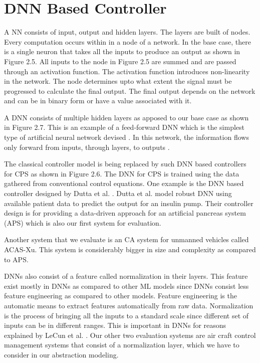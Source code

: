 \section{DNN Based Controller}


A \ac{NN} consists of input, output and hidden layers. 
The layers are built of nodes. Every computation occurs within in a node of a network.
In the base case, there is a single neuron that takes all the inputs to produce an output as shown in Figure 2.5. 
All inputs to the node in Figure 2.5 are summed and are passed through an activation function. 
The activation function introduces non-linearity in the network. 
The node determines upto what extent the signal must be progressed to calculate the final output. 
The final output depends on the network and can be in binary form or have a value associated with it. 


A \ac{DNN} consists of multiple hidden layers as apposed to our base case  as shown in Figure 2.7.
This is an example of a feed-forward \ac{DNN} which is the simplest type of artificial neural network devised \cite{feedforward}.
In this network, the information flows only forward from inputs, through layers, to outputs \cite{Zell}. 

The classical controller model is being replaced by such DNN based controllers for CPS as shown in  Figure 2.6.
The \ac{DNN} for \ac*{CPS} is trained using the data gathered from conventional control equations. 
One example is the DNN based controller designed by Dutta et al. \cite{Dutta_Others__2018__Robust}. 
Dutta et al. model robust DNN using available patient data to predict the output for an insulin pump.
Their controller design is for providing a data-driven approach for an artificial pancreas system (APS) which is also our first system for evaluation. 

Another system that we evaluate is an \ac{CA} system for unmanned vehicles \cite{7778055} called ACAS-Xu. 
This system is considerably bigger in size and complexity as compared to \ac{APS}. 

\ac{DNN}s also consist of a feature called normalization in their layers. 
This feature exist mostly in \ac{DNN}s as compared to other \ac{ML} models since \ac{DNN}s consist less feature engineering as compared to other models. 
Feature engineering is the automatic means to extract features automatically from raw data. 
Normalization is the process of bringing all the inputs to a standard scale since different set of inputs can be in different ranges. 
This is important in \ac{DNN}s for reasons explained by  LeCun et al.  \cite{10.5555/645754.668382}.
Our other two evaluation systems are air craft  control management systems \cite{10.1007/978-3-319-63387-9_5} that consist of a normalization layer, 
which we have to consider in our abstraction modeling. 

